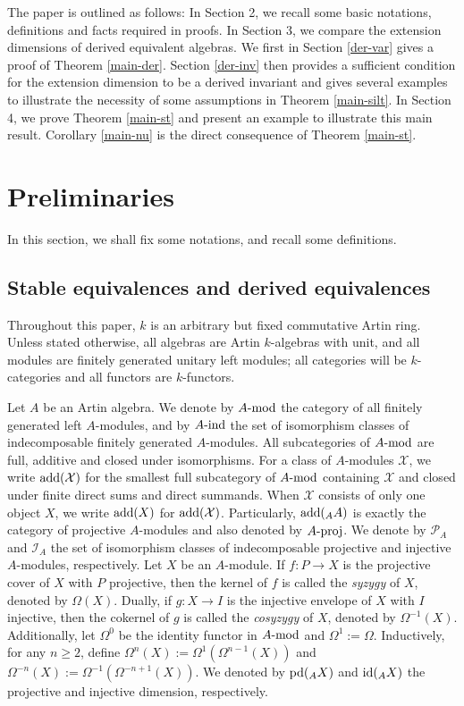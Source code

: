 \documentclass[12pt]{article}
\numberwithin{equation}{section}
\theoremstyle{definition}
\newcommand{\add}{{\rm add}}
\newcommand{\pd}{{\rm pd}}
\newcommand{\id}{{\rm id}}
\newcommand{\modcat}{\ensuremath{\mbox{{\rm -mod}}}}
\newcommand{\indmod}{\ensuremath{\mbox{{\rm -ind}}}}
\newcommand{\pmodcat}[1]{#1\mbox{{\rm -proj}}}
\newcommand{\ra}{\rightarrow}
\begin{document}
The paper is outlined as follows: In Section 2, we
recall some basic notations, definitions and facts required in proofs. In Section 3, we compare the extension dimensions of derived equivalent algebras. We first in Section \ref{der-var} gives a proof of Theorem \ref{main-der}. Section \ref{der-inv} then provides a sufficient condition for the extension dimension to be a derived invariant and gives several examples to illustrate the necessity of some assumptions in Theorem \ref{main-silt}. In Section 4, we prove Theorem \ref{main-st} and present an example to illustrate this main result. Corollary \ref{main-nu} is the direct consequence of Theorem \ref{main-st}.

\section{Preliminaries}
In this section, we shall fix some notations, and recall some definitions.

\subsection{Stable equivalences and derived equivalences}
Throughout this paper, $k$ is an arbitrary but fixed commutative Artin ring. Unless stated otherwise, all algebras are Artin $k$-algebras with unit, and all modules are finitely generated unitary left modules; all categories will be $k$-categories
and all functors are $k$-functors.

Let $A$ be an Artin algebra. We denote by $A\modcat$ the category of all finitely generated left $A$-modules, and by $A\indmod$ the set of isomorphism classes of indecomposable finitely generated $A$-modules. All subcategories of $A\modcat$ are full, additive and closed under isomorphisms.
For a class of $A$-modules $\mathcal{X}$, we write $\add(\mathcal{X})$ for the smallest full subcategory of $A\modcat$ containing $\mathcal{X}$ and closed under finite direct sums and direct summands.
When $\mathcal{X}$ consists of only one object $X$, we write $\add(X)$ for $\add(\mathcal{X})$.
Particularly, $\add({_A}A)$ is exactly the category of projective $A$-modules and also denoted by $A\pmodcat$. We denote by $\mathscr{P}_A$ and $\mathscr{I}_A$ the set of isomorphism classes of indecomposable projective and injective $A$-modules, respectively.
Let $X$ be an $A$-module.
If $f:P\ra X$ is the projective cover of $X$ with $P$ projective, then the kernel of $f$ is called the \emph{syzygy} of $X$, denoted by $\Omega(X)$.
Dually, if $g:X\ra I$ is the injective envelope of $X$ with $I$ injective, then the cokernel of $g$ is called the \emph{cosyzygy} of $X$, denoted by $\Omega^{-1}(X)$. Additionally, let $\Omega^0$ be the identity functor in $A\modcat$ and $\Omega^1:=\Omega$. Inductively, for any $n\ge 2$, define $\Omega^n(X):=\Omega^1(\Omega^{n-1}(X))$ and $\Omega^{-n}(X):=\Omega^{-1}(\Omega^{-n+1}(X))$.
We denoted by $\pd(_AX)$ and $\id(_AX)$ the projective and injective dimension, respectively.
\end{document}
